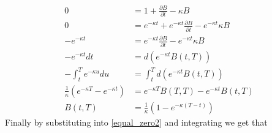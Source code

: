 \begin{align}
   0 &= 1 + \frac{\partial B}{\partial t} - \kappa B \nonumber  \\
   0 &= e^{-\kappa t} + e^{-\kappa t} \frac{\partial B}{\partial t} - e^{-\kappa t} \kappa B \nonumber \\
   -e^{-\kappa t} &= e^{-\kappa t} \frac{\partial B}{\partial t} - e^{-\kappa t} \kappa B  \nonumber \\
   -e^{-\kappa t} dt &= d \left( e^{-\kappa t} B(t, T) \right) \nonumber \\
   - \int_{t}^{T} e^{-\kappa u} du &= \int_{t}^{T} d \left( e^{-\kappa t} B(t, T) \right) \nonumber  \\
   \frac{1}{\kappa} \left( e^{-\kappa T} - e^{-\kappa t} \right) &= e^{-\kappa T} B(T, T) - e^{-\kappa t} B(t, T)\nonumber  \\
   B(t,T) & =\frac{1}{\kappa} \left( 1 - e^{-\kappa (T-t)} \right)  
\end{align}
Finally  by substituting into \autoref{equal_zero2} and integrating we get that
